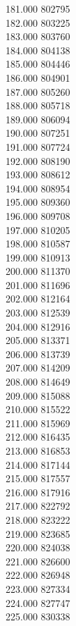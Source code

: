{ 181.000	802795 \\
 182.000	803225 \\
 183.000	803760 \\
 184.000	804138 \\
 185.000	804446 \\
 186.000	804901 \\
 187.000	805260 \\
 188.000	805718 \\
 189.000	806094 \\
 190.000	807251 \\
 191.000	807724 \\
 192.000	808190 \\
 193.000	808612 \\
 194.000	808954 \\
 195.000	809360 \\
 196.000	809708 \\
 197.000	810205 \\
 198.000	810587 \\
 199.000	810913 \\
 200.000	811370 \\
 201.000	811696 \\
 202.000	812164 \\
 203.000	812539 \\
 204.000	812916 \\
 205.000	813371 \\
 206.000	813739 \\
 207.000	814209 \\
 208.000	814649 \\
 209.000	815088 \\
 210.000	815522 \\
 211.000	815969 \\
 212.000	816435 \\
 213.000	816853 \\
 214.000	817144 \\
 215.000	817557 \\
 216.000	817916 \\
 217.000	822792 \\
 218.000	823222 \\
 219.000	823685 \\
 220.000	824038 \\
 221.000	826600 \\
 222.000	826948 \\
 223.000	827334 \\
 224.000	827747 \\
 225.000	830338 \\
}
